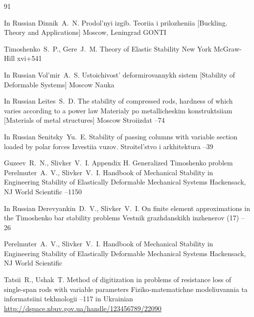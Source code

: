 \begin{thebibliography}{91}

\lang In Russian
\by Dinnik~A.~N.
\book  Prodol'nyi izgib. Teoriia i prilozheniia \rm [Buckling. Theory and Applications]
\publaddr  Moscow, Leningrad
\publ GONTI

\by Timoshenko~S.~P., Gere~J.~M.
\book  Theory of Elastic Stability
\publaddr New York
\publ McGraw-Hill
\totalpages xvi+541

\lang In Russian
\by Vol'mir~A.~S.
\book  Ustoichivost' deformirovannykh sistem \rm [Stability of Deformable Systems]
\publaddr Moscow
\publ Nauka


\lang In Russian
\by Leites~S.~D.
\paper The stability of compressed rods, hardness of which varies according to a power law
\inbook Materialy po metallicheskim konstruktsiiam \rm [Materials of metal structures]
\publaddr Moscow
\publ Stroiizdat 
--74


\lang In Russian
\by Senitsky~Yu.~E.
\paper  Stability of passing columns with variable section loaded by  polar forces
\jour Izvestiia vuzov. Stroitel'stvo i arkhitektura 
--39


\by Guzeev~R.~N., Slivker~V.~I.
\paper  Appendix H. Generalized Timoshenko problem
\inbook Perel\-mu\-ter~A.~V., Slivker~V.~I. Handbook of Mechanical Stability in Engineering
\volinfo  Stability of Elastically Deformable Mechanical Systems
\publaddr Hackensack, NJ
\publ World Scientific
--1150

\lang In Russian
\by Derevyankin~D.~V., Slivker~V.~I.
\paper On finite element approximations in the Timoshenko bar stability problems
\jour Vestnik grazhdanskikh inzhenerov
(17)
--26

\by Perelmuter~A.~V., Slivker~V.~I. 
\book Handbook of Mechanical Stability in Engineering
\volinfo  Stability of Elastically Deformable Mechanical Systems
\publaddr Hackensack, NJ
\publ World Scientific

\by  Tatsii~R., Ushak~T.
\paper Method of digitization in problems of resistance loss of single-span rods with variable parameters
\jour  Fiziko-matematichne modeliuvannia ta informatsiini tekhnologii
--117
\lang in Ukrainian
\elink \url{http://dspace.nbuv.gov.ua/handle/123456789/22090}



\end{thebibliography}
